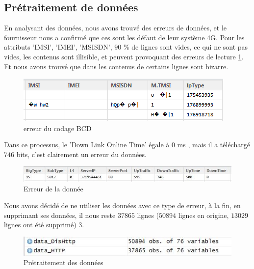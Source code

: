 \subsection{Prétraitement de données}
En analysant des données, nous avons trouvé des erreurs de données, et le fournisseur nous a confirmé que ces sont les défaut de leur système 4G. Pour les attributs 'IMSI', 'IMEI', 'MSISDN', $90$ \% de lignes sont vides, ce qui ne sont pas vides, les contenus sont illisible, et peuvent provoquant des erreurs de lecture \ref{fig:errorData}. Et nous avons trouvé que dans les contenus de certains lignes sont bizarre. 
\begin{figure}[H]
	\centering
	\includegraphics[width=0.7\linewidth]{images/errorData}
	\caption{erreur du codage BCD}
	\label{fig:errorData}
\end{figure}
Dans ce processus, le 'Down Link Online Time' égale à  $0$ ms , mais il a téléchargé $746$ bits, c'est clairement un erreur du données.
\begin{figure}[H]
	\centering
	\includegraphics[width=0.9\linewidth]{images/bizarre}
	\caption{Erreur de la donnée}
	\label{fig:bizarre}
\end{figure}

 Nous avons décidé de ne utiliser les données avec ce type de erreur, à la fin, en supprimant ses données, il nous reste $37865$ lignes ($50894$ lignes en origine, $13029$ lignes ont été supprimé)  \ref{fig:newdata}.
 
\begin{figure}[H]
	\centering
	\includegraphics[width=0.8\linewidth]{images/newdata}
	\caption{Prétraitement des données}
	\label{fig:newdata}
\end{figure}

